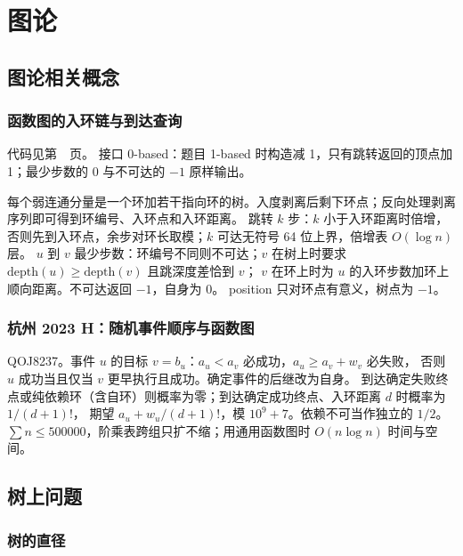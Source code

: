 \part{图论}

\Needspace{180pt}

\chapter{图论相关概念}

\section{函数图的入环链与到达查询}\label{knowledge-functional-graph}
代码见第~\pageref{compact-FunctionalGraph}~页。
接口 0-based：题目 1-based 时构造减 1，只有跳转返回的顶点加 1；最少步数的 0 与不可达的 $-1$ 原样输出。

每个弱连通分量是一个环加若干指向环的树。入度剥离后剩下环点；反向处理剥离序列即可得到环编号、入环点和入环距离。
跳转 $k$ 步：$k$ 小于入环距离时倍增，否则先到入环点，余步对环长取模；$k$ 可达无符号 64 位上界，倍增表 $O(\log n)$ 层。
$u$ 到 $v$ 最少步数：环编号不同则不可达；$v$ 在树上时要求 $\mathrm{depth}(u)\ge\mathrm{depth}(v)$ 且跳深度差恰到 $v$；
$v$ 在环上时为 $u$ 的入环步数加环上顺向距离。不可达返回 $-1$，自身为 0。
position 只对环点有意义，树点为 $-1$。

\clearpage


\section{杭州 2023 H：随机事件顺序与函数图}\label{knowledge-hangzhou-h}
QOJ8237。事件 $u$ 的目标 $v=b_u$：$a_u<a_v$ 必成功，$a_u\ge a_v+w_v$ 必失败，
否则 $u$ 成功当且仅当 $v$ 更早执行且成功。确定事件的后继改为自身。
到达确定失败终点或纯依赖环（含自环）则概率为零；到达确定成功终点、入环距离 $d$ 时概率为 $1/(d+1)!$，
期望 $a_u+w_u/(d+1)!$，模 $10^9+7$。依赖不可当作独立的 $1/2$。
$\sum n\le500000$，阶乘表跨组只扩不缩；用通用函数图时 $O(n\log n)$ 时间与空间。

\newpage


\Needspace{180pt}

\chapter{树上问题}

\section{树的直径}

